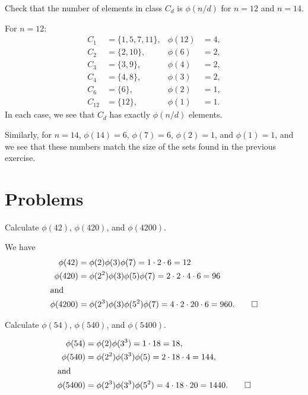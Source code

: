  Check that the number of elements in class $C_d$ is
$\phi(n/d)$ for $n = 12$ and $n = 14$.
\begin{solution}
  For $n = 12$:
  \begin{align*}
    C_1 &= \{1,5,7,11\}, & \phi(12) &= 4, \\
    C_2 &= \{2,10\}, & \phi(6) &= 2, \\
    C_3 &= \{3,9\}, & \phi(4) &= 2, \\
    C_4 &= \{4,8\}, & \phi(3) &= 2, \\
    C_6 &= \{6\}, & \phi(2) &= 1, \\
    C_{12} &= \{12\}, & \phi(1) &= 1.
  \end{align*}
  In each case, we see that $C_d$ has exactly $\phi(n/d)$ elements.

  Similarly, for $n = 14$, $\phi(14) = 6$, $\phi(7) = 6$,
  $\phi(2) = 1$, and $\phi(1) = 1$, and we see that these numbers
  match the size of the sets found in the previous exercise.
\end{solution}

\section{Problems}

 Calculate $\phi(42)$, $\phi(420)$, and $\phi(4200)$.
\begin{solution}
  We have
  \begin{align*}
    \phi(42) &= \phi(2)\phi(3)\phi(7) = 1\cdot2\cdot6 = 12 \\
    \phi(420) &= \phi(2^2)\phi(3)\phi(5)\phi(7)
                = 2\cdot2\cdot4\cdot6 = 96 \\
    \intertext{and}
    \phi(4200) &= \phi(2^3)\phi(3)\phi(5^2)\phi(7)
                 = 4\cdot2\cdot20\cdot6 = 960. \qedhere
  \end{align*}
\end{solution}

 Calculate $\phi(54)$, $\phi(540)$, and $\phi(5400)$.
\begin{solution}
  \begin{align*}
    \phi(54) &= \phi(2)\phi(3^3) = 1\cdot18 = 18, \\
    \phi(540) &= \phi(2^2)\phi(3^3)\phi(5)
                = 2\cdot18\cdot4 = 144, \\
    \intertext{and}
    \phi(5400) &= \phi(2^3)\phi(3^3)\phi(5^2)
                 = 4\cdot18\cdot20 = 1440. \qedhere
  \end{align*}
\end{solution}

